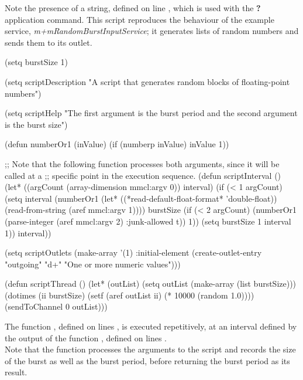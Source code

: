 Note the presence of a  string, defined on line , which is
used with the \textbf{?} application command.
\secondaryEnd
\condPage
{}
This script reproduces the behaviour of the example service,
\emph{m+mRandomBurstInputService}; it generates lists of random numbers and sends them to
its outlet.
\codeBegin
\begin{listing}[5]{1}
(setq burstSize 1)

(setq scriptDescription "A script that generates random blocks of floating-point numbers")

(setq scriptHelp
      "The first argument is the burst period and the second argument is the burst size")

(defun numberOr1 (inValue)
  (if (numberp inValue) inValue 1))

;; Note that the following function processes both arguments, since it will be called at a
;; specific point in the execution sequence.
(defun scriptInterval ()
  (let* ((argCount (array-dimension mmcl:argv 0)) interval)
    (if (< 1 argCount)
	(setq interval (numberOr1 (let* ((*read-default-float-format* 'double-float))
				    (read-from-string (aref mmcl:argv 1))))
	      burstSize (if (< 2 argCount)
			    (numberOr1 (parse-integer (aref mmcl:argv 2) :junk-allowed t))
			  1))
      (setq burstSize 1 interval 1))
    interval))

(setq scriptOutlets (make-array '(1) :initial-element
				(create-outlet-entry "outgoing" "d+"
						     "One or more numeric values")))

(defun scriptThread ()
  (let* (outList)
    (setq outList (make-array (list burstSize)))
    (dotimes (ii burstSize)
      (setf (aref outList ii) (* 10000 (random 1.0))))
    (sendToChannel 0 outList)))
\end{listing}
\codeEnd{}
The function , defined on lines \longDash{}, is
executed repetitively, at an interval defined by the output of the function
, defined on lines \longDash{}.\\

Note that the  function processes the arguments to the script and
records the size of the burst as well as the burst period, before returning the burst
period as its result.
\secondaryEnd
\appendixEnd{}
